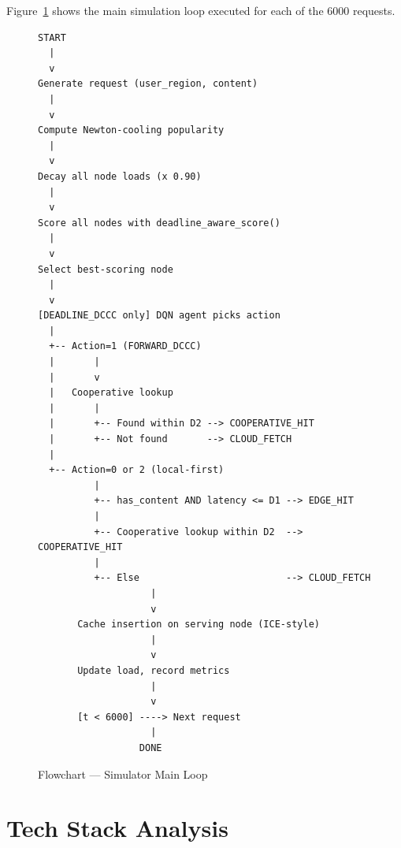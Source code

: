 \documentclass[12pt,a4paper]{report}
\begin{document}
Figure~\ref{fig:flowchart} shows the main simulation loop executed for each of the 6000
requests.

\begin{figure}[H]
  \centering
\begin{lstlisting}[language={},caption={},label={},numbers=none,frame=single,
  basicstyle=\ttfamily\footnotesize]
START
  |
  v
Generate request (user_region, content)
  |
  v
Compute Newton-cooling popularity
  |
  v
Decay all node loads (x 0.90)
  |
  v
Score all nodes with deadline_aware_score()
  |
  v
Select best-scoring node
  |
  v
[DEADLINE_DCCC only] DQN agent picks action
  |
  +-- Action=1 (FORWARD_DCCC)
  |       |
  |       v
  |   Cooperative lookup
  |       |
  |       +-- Found within D2 --> COOPERATIVE_HIT
  |       +-- Not found       --> CLOUD_FETCH
  |
  +-- Action=0 or 2 (local-first)
          |
          +-- has_content AND latency <= D1 --> EDGE_HIT
          |
          +-- Cooperative lookup within D2  --> COOPERATIVE_HIT
          |
          +-- Else                          --> CLOUD_FETCH
                    |
                    v
       Cache insertion on serving node (ICE-style)
                    |
                    v
       Update load, record metrics
                    |
                    v
       [t < 6000] ----> Next request
                    |
                  DONE
\end{lstlisting}
  \caption{Flowchart --- Simulator Main Loop}
  \label{fig:flowchart}
\end{figure}

\section{Tech Stack Analysis}
\end{document}
